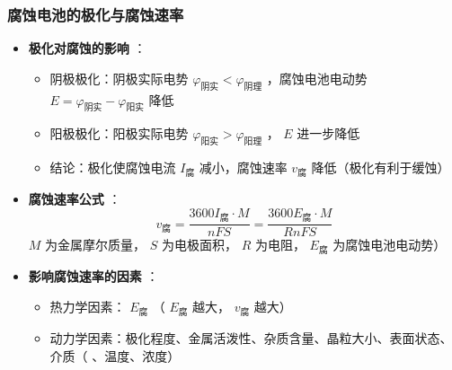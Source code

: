 \subsubsection{腐蚀电池的极化与腐蚀速率} 
\begin{itemize} 
    \item \textbf{极化对腐蚀的影响} ：
    \begin{itemize} 
        \item 阴极极化：阴极实际电势 $ \varphi_{\text{阴实} }  < \varphi_{\text{阴理} }  $ ，腐蚀电池电动势 $ E = \varphi_{\text{阴实} }  - \varphi_{\text{阳实} }  $ 降低
        \item 阳极极化：阳极实际电势 $ \varphi_{\text{阳实} }  > \varphi_{\text{阳理} }  $ ， $ E $ 进一步降低
        \item 结论：极化使腐蚀电流 $ I_{\text{腐} }  $ 减小，腐蚀速率 $ v_{\text{腐} }  $ 降低（极化有利于缓蚀）
    \end{itemize} 
    
    \item \textbf{腐蚀速率公式} ： $$ v_{\text{腐} }  = \frac{3600 I_{\text{腐} }  \cdot M}{n F S}  = \frac{3600 E_{\text{腐} }  \cdot M}{R n F S}  $$ $ M $ 为金属摩尔质量， $ S $ 为电极面积， $ R $ 为电阻， $ E_{\text{腐} }  $ 为腐蚀电池电动势）
    
    \item \textbf{影响腐蚀速率的因素} ：
    \begin{itemize} 
        \item 热力学因素： $ E_{\text{腐} }  $ （ $ E_{\text{腐} }  $ 越大， $ v_{\text{腐} }  $ 越大）
        \item 动力学因素：极化程度、金属活泼性、杂质含量、晶粒大小、表面状态、介质（  、温度、浓度）
    \end{itemize} 
\end{itemize} 

